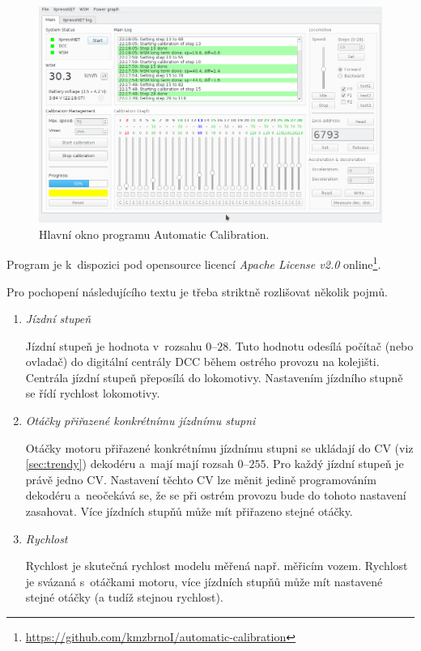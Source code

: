 \begin{figure}[ht]
\includegraphics[width=\textwidth]{data/ac_progress.png}
\caption{Hlavní okno programu Automatic Calibration.}
\label{fig:ac-gui}
\end{figure}

Program je k~dispozici pod opensource licencí \textit{Apache License v2.0}
online\footnote{\url{https://github.com/kmzbrnoI/automatic-calibration}}.

Pro pochopení následujícího textu je třeba striktně rozlišovat několik pojmů.

\begin{enumerate}
\item \textit{Jízdní stupeň}

Jízdní stupeň je hodnota v~rozsahu $0$--$28$. Tuto hodnotu odesílá počítač
(nebo ovladač) do digitální centrály \gls{DCC} během ostrého provozu na kolejišti.
Centrála jízdní stupeň přeposílá do lokomotivy. Nastavením jízdního stupně
se řídí rychlost lokomotivy.

\item \textit{Otáčky přiřazené konkrétnímu jízdnímu stupni}

Otáčky motoru přiřazené konkrétnímu jízdnímu stupni se ukládají do \gls{CV}
(viz \ref{sec:trendy}) dekodéru a~mají mají rozsah $0$--$255$. Pro každý jízdní
stupeň je právě jedno \gls{CV}. Nastavení těchto \gls{CV} lze měnit jedině
programováním dekodéru a~neočekává se, že se při ostrém provozu bude do tohoto
nastavení zasahovat. Více jízdních stupňů může mít přiřazeno stejné otáčky.

\item \textit{Rychlost}

Rychlost je skutečná rychlost modelu měřená např. měřicím vozem. Rychlost
je svázaná s~otáčkami motoru, více jízdních stupňů může mít nastavené
stejné otáčky (a tudíž stejnou rychlost).

\end{enumerate}

